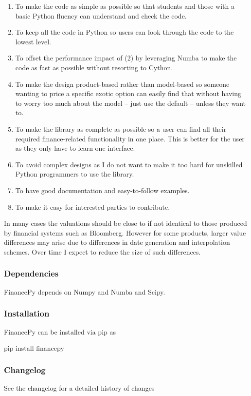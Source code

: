 \documentclass[twoside,11pt]{book}
\begin{document}
\begin{enumerate}
\item{ To make the code as simple as possible so that students and those with a basic Python fluency can understand and check the code.
}
\item{ To keep all the code in Python so users can look through the code to the lowest level. 
}
\item{ To offset the performance impact of (2) by leveraging Numba to make the code as fast as possible without resorting to Cython.
}
\item{ To make the design product-based rather than model-based so someone wanting to price a specific exotic option can easily find that without having to worry too much about the model – just use the default – unless they want to. 
}
\item{ To make the library as complete as possible so a user can find all their required finance-related functionality in one place. This is better for the user as they only have to learn one interface.
}
\item{ To avoid complex designs as I do not want to make it too hard for unskilled Python programmers to use the library.
}
\item{ To have good documentation and easy-to-follow examples.
}
\item{ To make it easy for interested parties to contribute.
}
\end{enumerate}

In many cases the valuations should be close to if not identical to those produced by financial systems such as Bloomberg. However for some products, larger value differences may arise due to differences in date generation and interpolation schemes. Over time I expect to reduce the size of such differences.


\subsubsection*{Dependencies}
FinancePy depends on Numpy and Numba and Scipy.


\subsubsection*{Installation}
FinancePy can be installed via pip as

pip install financepy


\subsubsection*{Changelog}
See the changelog for a detailed history of changes 
\end{document}
